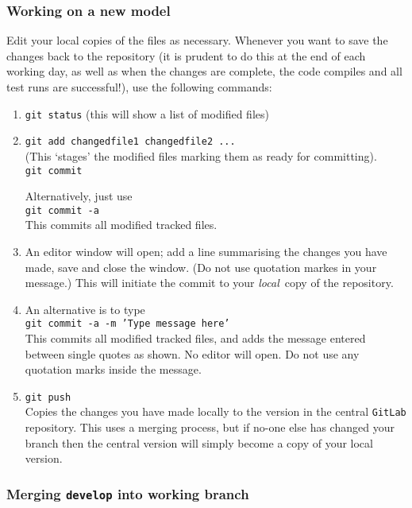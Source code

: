 \documentclass[11pt,a4paper]{report}
\begin{document}
\subsubsection{Working on a new model}

Edit your local copies of the files as necessary. Whenever you want to save
the changes back to the repository (it is prudent to do this at the end of
each working day, as well as when the changes are complete, the code compiles
and all test runs are successful!), use the following commands:
\begin{enumerate}

\item \texttt{git status}  (this will show a list of modified files)

\item \texttt{git add changedfile1 changedfile2 ...}  \\
  (This `stages' the modified files marking them as ready for committing).  \\
  \texttt{git commit}

  Alternatively, just use\\
  \texttt{git commit -a} \\
  This commits all modified tracked files.

\item An editor window will open; add a line summarising the changes you have made, save and close the window. (Do not use quotation markes in your message.) This will initiate the commit to your \textit{local}\ copy of the repository.

\item An alternative is to type\\
\texttt{git commit -a -m 'Type message here'} \\
This commits all modified tracked files, and adds the message entered between single quotes as shown.  No editor will open.  Do not use any quotation marks inside the message.

\item \texttt{git push} \\
Copies the changes you have made locally to the version in the central \texttt{GitLab} repository.  This uses a merging process, but if no-one else has changed your branch then the central version will simply become a copy of your local version.

\end{enumerate}

\subsubsection{Merging \texttt{develop} into working branch}
\end{document}
